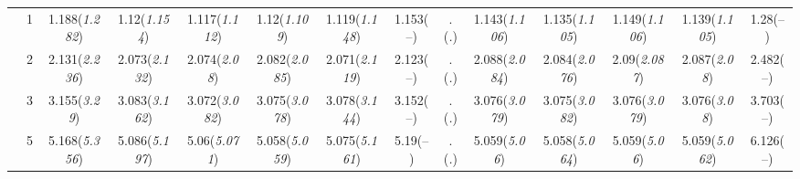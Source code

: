 \documentclass{article}
\begin{document}
\begin{table}[tbp]
{\begin{tabularx}{\textwidth}{lCCCCCCCCCCCCC}
&1&1.188\newline (\emph{1.282})&1.12\newline (\emph{1.154})&1.117\newline (\emph{1.112})&1.12\newline (\emph{1.109})&1.119\newline (\emph{1.148})&1.153\newline (--)&.\newline (\emph{.})&1.143\newline (\emph{1.106})&1.135\newline (\emph{1.105})&1.149\newline (\emph{1.106})&1.139\newline (\emph{1.105})&1.28\newline (--) \tabularnewline
&2&2.131\newline (\emph{2.236})&2.073\newline (\emph{2.132})&2.074\newline (\emph{2.08})&2.082\newline (\emph{2.085})&2.071\newline (\emph{2.119})&2.123\newline (--)&.\newline (\emph{.})&2.088\newline (\emph{2.084})&2.084\newline (\emph{2.076})&2.09\newline (\emph{2.087})&2.087\newline (\emph{2.08})&2.482\newline (--) \tabularnewline
&3&3.155\newline (\emph{3.29})&3.083\newline (\emph{3.162})&3.072\newline (\emph{3.082})&3.075\newline (\emph{3.078})&3.078\newline (\emph{3.144})&3.152\newline (--)&.\newline (\emph{.})&3.076\newline (\emph{3.079})&3.075\newline (\emph{3.082})&3.076\newline (\emph{3.079})&3.076\newline (\emph{3.08})&3.703\newline (--) \tabularnewline
&5&5.168\newline (\emph{5.356})&5.086\newline (\emph{5.197})&5.06\newline (\emph{5.071})&5.058\newline (\emph{5.059})&5.075\newline (\emph{5.161})&5.19\newline (--)&.\newline (\emph{.})&5.059\newline (\emph{5.06})&5.058\newline (\emph{5.064})&5.059\newline (\emph{5.06})&5.059\newline (\emph{5.062})&6.126\newline (--) \tabularnewline

\end{tabularx}}
\end{table}
\end{document}
